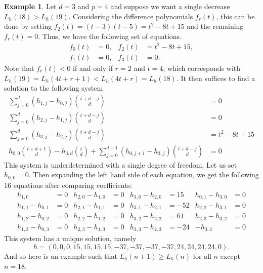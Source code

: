 \documentclass[12pt]{amsart}
\theoremstyle{definition}
\newtheorem{example}[thm]{Example}
\numberwithin{equation}{section}
\renewcommand\>{\rangle}
\newcommand\<{\langle}
\newcommand\0{\mathbf{0}}
\begin{document}
\begin{example}\label{ex:general_single_decrease}
	Let $d = 3$ and $p = 4$ and suppose we want a single decrease $L_h(18) > L_h(19)$. Considering the difference polynomials $f_r(t)$, this can be done by setting $f_2(t) = (t - 3)(t - 5) = t^2 - 8t + 15$ and the remaining $f_r(t) = 0$. Thus, we have the following set of equations.
	\begin{align*}
		f_0(t) &= 0,  &	f_2(t) &= t^2 - 8t + 15, \\
		f_1(t) &= 0,  &	f_3(t) &= 0.
	\end{align*}
	Note that $f_r(t) < 0$ if and only if $r = 2$ and $t = 4$, which corresponds with $L_h(19) = L_h(4t+r+1) < L_h(4t+r) = L_h(18)$. It then suffices to find a solution to the following system
	\begin{align*}
		\sum_{j=0}^d (h_{1,j} - h_{0,j}) \binom{t+d-j}{d} &= 0 \\
		\sum_{j=0}^d (h_{2,j} - h_{1,j}) \binom{t+d-j}{d} &= 0 \\
		\sum_{j=0}^d (h_{3,j} - h_{2,j}) \binom{t+d-j}{d} &= t^2 - 8t + 15 \\
		h_{0,0} \binom{t+d+1}{d} - h_{3,d}\binom{t}{d} + \sum_{j=0}^{d-1} \left(h_{0,j+1} - h_{3,j}\right) \binom{t+d-j}{d} &= 0
	\end{align*}
	This system is underdetermined with a single degree of freedom. Let us set $h_{0,0} = 0$. Then expanding the left hand side of each equation, we get the following 16 equations after comparing coefficients:
	\begin{align*}
		h_{1,0}  &= 0 & h_{2,0} - h_{1,0} &= 0 & h_{3,0} - h_{2,0} &= 15 & h_{0,1} - h_{3,0} &= 0\\
		h_{1,1} - h_{0,1} &= 0 & h_{2,1} - h_{1,1} &= 0 & h_{3,1} - h_{2,1} &= -52 & h_{2,2} - h_{3,1} &= 0\\
		h_{1,2} - h_{0,2} &= 0 & h_{2,2} - h_{1,2} &= 0 & h_{3,2} - h_{2,2} &= 61 & h_{2,3} - h_{3,2} &= 0\\
		h_{1,3} - h_{0,3} &= 0 & h_{2,3} - h_{1,3} &= 0 & h_{3,3} - h_{2,3} &= -24 & - h_{3,3} &= 0
	\end{align*}
	This system has a unique solution, namely
	\[h = (0,0,0,15,15,15,15,-37,-37,-37,-37,24,24,24,24,0).\]
	And so here is an example such that $L_h(n+1) \geq L_h(n)$ for all $n$ except $n = 18$.
\end{example}
\end{document}

